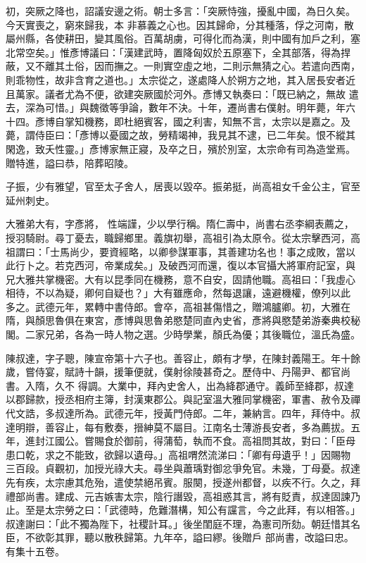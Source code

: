\begin{pinyinscope}
 初，突厥之降也，詔議安邊之術。朝士多言：「突厥恃強，擾亂中國，為日久矣。今天實喪之，窮來歸我，本
 非慕義之心也。因其歸命，分其種落，俘之河南，散屬州縣，各使耕田，變其風俗。百萬胡虜，可得化而為漢，則中國有加戶之利，塞北常空矣。」惟彥博議曰：「漢建武時，置降匈奴於五原塞下，全其部落，得為捍蔽，又不離其土俗，因而撫之。一則實空虛之地，二則示無猜之心。若遣向西南，則乖物性，故非含育之道也。」太宗從之，遂處降人於朔方之地，其入居長安者近且萬家。議者尤為不便，欲建突厥國於河外。彥博又執奏曰：「既已納之，無故
 遣去，深為可惜。」與魏徵等爭論，數年不決。十年，遷尚書右僕射。明年薨，年六十四。彥博自掌知機務，即杜絕賓客，國之利害，知無不言，太宗以是嘉之。及薨，謂侍臣曰：「彥博以憂國之故，勞精竭神，我見其不逮，已二年矣。恨不縱其閑逸，致夭性靈。」彥博家無正寢，及卒之日，殯於別室，太宗命有司為造堂焉。贈特進，謚曰恭，陪葬昭陵。



 子振，少有雅望，官至太子舍人，居喪以毀卒。振弟挺，尚高祖女千金公主，官至延州刺史。



 大雅弟大有，字彥將，
 性端謹，少以學行稱。隋仁壽中，尚書右丞李綱表薦之，授羽騎尉。尋丁憂去，職歸鄉里。義旗初舉，高祖引為太原令。從太宗擊西河，高祖謂曰：「士馬尚少，要資經略，以卿參謀軍事，其善建功名也！事之成敗，當以此行卜之。若克西河，帝業成矣。」及破西河而還，復以本官攝大將軍府記室，與兄大雅共掌機密。大有以昆季同在機務，意不自安，固請他職。高祖曰：「我虛心相待，不以為疑，卿何自疑也？」大有雖應命，然每退讓，遠避機權，僚列以此
 多之。武德元年，累轉中書侍郎。會卒，高祖甚傷惜之，贈鴻臚卿。初，大雅在隋，與顏思魯俱在東宮，彥博與思魯弟愍楚同直內史省，彥將與愍楚弟游秦典校秘閣。二家兄弟，各為一時人物之選。少時學業，顏氏為優；其後職位，溫氏為盛。



 陳叔達，字子聰，陳宣帝第十六子也。善容止，頗有才學，在陳封義陽王。年十餘歲，嘗侍宴，賦詩十韻，援筆便就，僕射徐陵甚奇之。歷侍中、丹陽尹、都官尚書。入隋，久不
 得調。大業中，拜內史舍人，出為絳郡通守。義師至絳郡，叔達以郡歸款，授丞相府主簿，封漢東郡公。與記室溫大雅同掌機密，軍書、赦令及禪代文誥，多叔達所為。武德元年，授黃門侍郎。二年，兼納言。四年，拜侍中。叔達明辯，善容止，每有敷奏，搢紳莫不屬目。江南名士薄游長安者，多為薦拔。五年，進封江國公。嘗賜食於御前，得蒲萄，執而不食。高祖問其故，對曰：「臣母患口乾，求之不能致，欲歸以遺母。」高祖喟然流涕曰：「卿有母遺乎！」因賜物
 三百段。貞觀初，加授光祿大夫。尋坐與蕭瑀對御忿爭免官。未幾，丁母憂。叔達先有疾，太宗慮其危殆，遣使禁絕吊賓。服闋，授遂州都督，以疾不行。久之，拜禮部尚書。建成、元吉嫉害太宗，陰行譖毀，高祖惑其言，將有貶責，叔達固諫乃止。至是太宗勞之曰：「武德時，危難潛構，知公有讜言，今之此拜，有以相答。」叔達謝曰：「此不獨為陛下，社稷計耳。」後坐閨庭不理，為憲司所劾。朝廷惜其名臣，不欲彰其罪，聽以散秩歸第。九年卒，謚曰繆。後贈戶
 部尚書，改謚曰忠。有集十五卷。




\end{pinyinscope}

